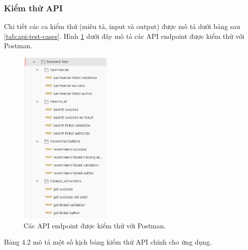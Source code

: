 \subsubsection{Kiểm thử API}

Chi tiết các ca kiểm thử (miêu tả, input và output) được mô tả dưới bảng sau \ref{tab:api-test-cases}. Hình \ref{fig:postman} dưới đây mô tả các API endpoint được kiểm thử với Postman\cite{postman}.  

\begin{figure}[H]
    \centering  
    \includegraphics[width=0.4\textwidth]{figures/c4/api_test.png}
    \caption{Các API endpoint được kiểm thử với Postman.}
    \label{fig:postman}
\end{figure}


Bảng 4.2 mô tả một số kịch bảng kiểm thử API chính cho ứng dụng. 

